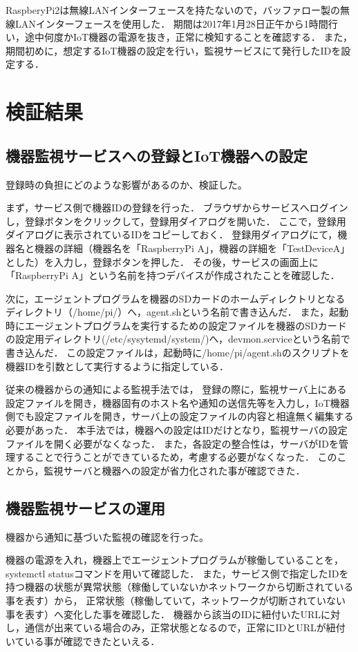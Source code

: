 RaspberyPi2は無線LANインターフェースを持たないので，バッファロー製の無線LANインターフェースを使用した．
期間は2017年1月28日正午から1時間行い，途中何度かIoT機器の電源を抜き，正常に検知することを確認する．
また，期間初めに，想定するIoT機器の設定を行い，監視サービスにて発行したIDを設定する．

\section{検証結果}
\subsection{機器監視サービスへの登録とIoT機器への設定}
登録時の負担にどのような影響があるのか、検証した。

まず，サービス側で機器IDの登録を行った．
ブラウザからサービスへログインし，登録ボタンをクリックして，登録用ダイアログを開いた．
ここで，登録用ダイアログに表示されているIDをコピーしておく．
登録用ダイアログにて，機器名と機器の詳細（機器名を「RaspberryPi A」，機器の詳細を「TestDeviceA」とした）を入力し，登録ボタンを押した．
その後，サービスの画面上に「RaspberryPi A」という名前を持つデバイスが作成されたことを確認した．
\medskip

次に，エージェントプログラムを機器のSDカードのホームディレクトリとなるディレクトリ（/home/pi/）へ，agent.shという名前で書き込んだ．
また，起動時にエージェントプログラムを実行するための設定ファイルを機器のSDカードの設定用ディレクトリ(/etc/sysytemd/system/)へ，devmon.serviceという名前で書き込んだ．
この設定ファイルは，起動時に/home/pi/agent.shのスクリプトを機器IDを引数として実行するように指定している．
\medskip

従来の機器からの通知による監視手法では，
登録の際に，監視サーバ上にある設定ファイルを開き，機器固有のホスト名や通知の送信先等を入力し，IoT機器側でも設定ファイルを開き，サーバ上の設定ファイルの内容と相違無く編集する必要があった．
本手法では，機器への設定はIDだけとなり，監視サーバの設定ファイルを開く必要がなくなった．
また，各設定の整合性は，サーバがIDを管理することで行うことができているため，考慮する必要がなくなった．
このことから，監視サーバと機器への設定が省力化された事が確認できた．

\subsection{機器監視サービスの運用}
機器から通知に基づいた監視の確認を行った。

機器の電源を入れ，機器上でエージェントプログラムが稼働していることを，systemctl statusコマンドを用いて確認した．
また，サービス側で指定したIDを持つ機器の状態が異常状態（稼働していないかネットワークから切断されている事を表す）から，
正常状態（稼働していて，ネットワークが切断されていない事を表す）へ変化した事を確認した．
機器から該当のIDに紐付いたURLに対し，通信が出来ている場合のみ，正常状態となるので，正常にIDとURLが紐付いている事が確認できたといえる．

